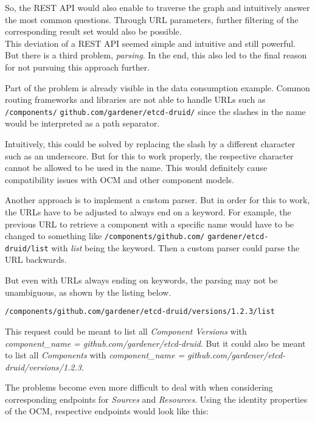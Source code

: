So, the REST API would also enable to traverse the graph and intuitively answer the most common questions. Through URL parameters, further filtering of the corresponding result set would also be possible.\\

This deviation of a REST API seemed simple and intuitive and still powerful. But there is a third problem, \emph{parsing}. In the end, this also led to the final reason for not pursuing this approach further.\par
Part of the problem is already visible in the data consumption example. Common routing frameworks and libraries are not able to handle URLs such as \lstinline|/components/| \lstinline|github.com/gardener/etcd-druid/| since the slashes in the name would be interpreted as a path separator.\par 
Intuitively, this could be solved by replacing the slash by a different character such as an underscore. But for this to work properly, the respective character cannot be allowed to be used in the name. This would definitely cause compatibility issues with OCM and other component models.\par 
Another approach is to implement a custom parser. But in order for this to work, the URLs have to be adjusted to always end on a keyword. For example, the previous URL to retrieve a component with a specific name would have to be changed to something like \lstinline|/components/github.com/| \lstinline|gardener/etcd-druid/list| with \emph{list} being the keyword. Then a custom parser could parse the URL backwards.\par
But even with URLs always ending on keywords, the parsing may not be unambiguous, as shown by the listing below.

\begin{lstlisting}[caption=Ambiguous REST API URL, captionpos=b, label=lst:Ambiguous URL]
/components/github.com/gardener/etcd-druid/versions/1.2.3/list
\end{lstlisting}

This request could be meant to list all \emph{Component Versions} with \emph{component\_name = github.com/gardener/etcd-druid}. But it could also be meant to list all \emph{Components} with \emph{component\_name = github.com/gardener/etcd-druid/versions/1.2.3}.\par
The problems become even more difficult to deal with when considering corresponding endpoints for \emph{Sources} and \emph{Resources}. Using the identity properties of the OCM, respective endpoints would look like this:

